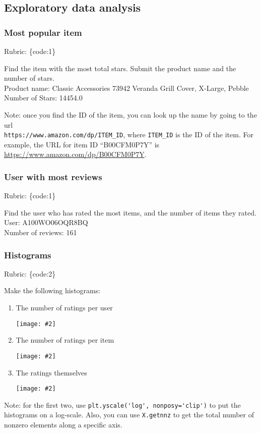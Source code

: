 \documentclass{article}
\def\rubric#1{\gre{Rubric: \{#1\}}}{}
\def\blu#1{{\color{blu}#1}}
\def\gre#1{{\color{gre}#1}}
\def\red#1{{\color{red}#1}}
\newcommand{\centerfig}[2]{\begin{center}\texttt{[image: \#2]}\end{center}}
\begin{document}
\subsection{Exploratory data analysis}

\subsubsection{Most popular item}
\rubric{code:1}

Find the item with the most total stars. \blu{Submit the product name and the number of stars}. \\
\red{Product name: Classic Accessories 73942 Veranda Grill Cover, X-Large, Pebble} \\
\red{Number of Stars: 14454.0}

Note: once you find the ID of the item, you can look up the name by going to the url \\ \verb|https://www.amazon.com/dp/ITEM_ID|, where \verb|ITEM_ID| is the ID of the item.
For example, the URL for item ID ``B00CFM0P7Y'' is \url{https://www.amazon.com/dp/B00CFM0P7Y}. 


\subsubsection{User with most reviews}
\rubric{code:1}

\blu{Find the user who has rated the most items, and the number of items they rated.}\\
\red{User: A100WO06OQR8BQ} \\
\red{Number of reviews: 161}

\subsubsection{Histograms}
\rubric{code:2}

\blu{Make the following histograms:}
\begin{enumerate}
\item The number of ratings per user
\centerfig{.7}{./figs/q_1_1_3_plot1.png}
\item The number of ratings per item
\centerfig{.7}{./figs/q_1_1_3_plot2.png}
\item The ratings themselves
\centerfig{.7}{./figs/q_1_1_3_plot3.png}
\end{enumerate}

Note: for the first two, use \verb|plt.yscale('log', nonposy='clip')| to put the histograms on a log-scale. Also, you can use \verb|X.getnnz| to get the total number of nonzero elements along a specific axis.
\end{document}

